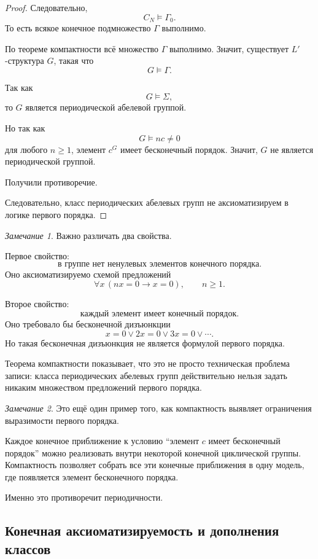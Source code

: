\documentclass[12pt,a4paper,oneside,openany]{book}
\theoremstyle{definition}
\theoremstyle{plain}
\theoremstyle{remark}
\newtheorem{remark}{Замечание}[chapter]
\begin{document}
\begin{proof}
Следовательно,
\[
C_N\models\Gamma_0.
\]
То есть всякое конечное подмножество \(\Gamma\) выполнимо.

По теореме компактности всё множество \(\Gamma\) выполнимо. Значит, существует \(L'\)-структура \(G\), такая что
\[
G\models\Gamma.
\]

Так как
\[
G\models\Sigma,
\]
то \(G\) является периодической абелевой группой.

Но так как
\[
G\models nc\ne 0
\]
для любого \(n\ge 1\), элемент \(c^G\) имеет бесконечный порядок. Значит, \(G\) не является периодической группой.

Получили противоречие.

Следовательно, класс периодических абелевых групп не аксиоматизируем в логике первого порядка.
\end{proof}

\begin{remark}
Важно различать два свойства.

Первое свойство:
\[
\text{в группе нет ненулевых элементов конечного порядка}.
\]
Оно аксиоматизируемо схемой предложений
\[
\forall x\,(nx=0\to x=0),
\qquad
n\ge 1.
\]

Второе свойство:
\[
\text{каждый элемент имеет конечный порядок}.
\]
Оно требовало бы бесконечной дизъюнкции
\[
x=0
\vee
2x=0
\vee
3x=0
\vee
\cdots.
\]
Но такая бесконечная дизъюнкция не является формулой первого порядка.

Теорема компактности показывает, что это не просто техническая проблема записи: класса периодических абелевых групп действительно нельзя задать никаким множеством предложений первого порядка.
\end{remark}

\begin{remark}
Это ещё один пример того, как компактность выявляет ограничения выразимости первого порядка.

Каждое конечное приближение к условию ``элемент \(c\) имеет бесконечный порядок'' можно реализовать внутри некоторой конечной циклической группы. Компактность позволяет собрать все эти конечные приближения в одну модель, где появляется элемент бесконечного порядка.

Именно это противоречит периодичности.
\end{remark}









\subsection{Конечная аксиоматизируемость и дополнения классов}
\end{document}
